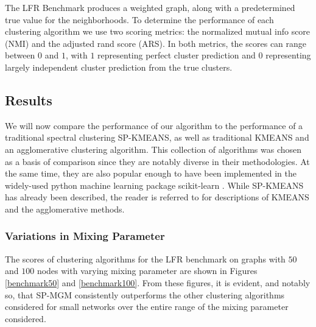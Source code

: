 \documentclass[10pt,journal,compsoc]{IEEEtran} %
\theoremstyle{definition}
\begin{document}
The LFR Benchmark produces a weighted graph,
along with a predetermined true value for the neighborhoods.  To
determine the performance of each clustering algorithm we use two
scoring metrics: the normalized mutual info score (NMI) and the
adjusted rand score (ARS).  In both metrics, the scores can range
between $0$ and $1$, with $1$ representing perfect cluster prediction
and $0$ representing largely independent cluster prediction from the
true clusters.

\subsection{Results}
We will now compare the performance of our algorithm to the
performance of a traditional spectral clustering SP-KMEANS, as well as
traditional KMEANS and an agglomerative clustering algorithm.  This
collection of algorithms was chosen as a basis of comparison since
they are notably diverse in their methodologies. At the same time,
they are also popular enough to have been implemented in the widely-used
python machine learning package scikit-learn
\cite{scikit-learn}.  While SP-KMEANS has already been described, the reader is
referred to \cite{rokach2005data} for descriptions of 
KMEANS and the agglomerative methods.

\subsubsection{Variations in Mixing Parameter}
The scores of clustering algorithms for the LFR benchmark on graphs
with $50$ and $100$ nodes with varying mixing parameter are shown in
Figures \ref{benchmark50} and \ref{benchmark100}.  From these figures,
it is evident, and notably so, that SP-MGM consistently outperforms
the other clustering algorithms considered for small networks over the
entire range of the mixing parameter considered.
\end{document}
